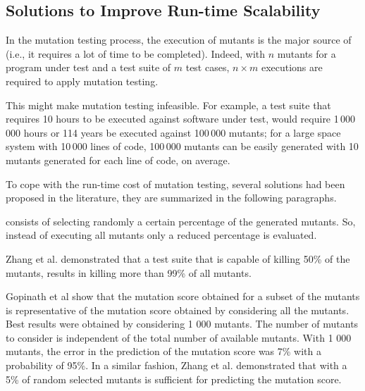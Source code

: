 
\subsection{Solutions to Improve Run-time Scalability}
\label{sec:opt:execution}

In the mutation testing process, the execution of mutants is the major source of  (i.e., it requires a lot of time to be completed). Indeed, with $n$ mutants for a program under test and a test suite of $m$ test cases, $n \times m$ executions are required to apply mutation testing.

This might make mutation testing infeasible. For example, a test suite that requires 10 hours to be executed against software under test, would require 1\,000\,000 hours or 114 years be executed against 100\,000 mutants; for a large space system with 10\,000 lines of code, 100\,000 mutants can be easily generated  with 10 mutants generated for each line of code, on average.

To cope with the run-time cost of mutation testing, several solutions had been proposed in the literature, they are summarized in the following paragraphs.

 consists of selecting randomly a certain percentage of the generated mutants. So, instead of executing all mutants only a reduced percentage is evaluated.

Zhang et al. \cite{zhang2010operator} demonstrated that a test suite that is capable of killing 50\% of the mutants, results in killing more than 99\% of all mutants.

Gopinath et al \cite{gopinath2015hard} show that the mutation score obtained for a subset of the mutants is representative of the mutation score obtained by considering all the mutants. Best results were obtained by considering 1 000 mutants. The number of mutants to consider is independent of the total number of available mutants. With 1 000 mutants, the error in the prediction of the mutation score was 7\% with a probability of 95\%. 
In a similar fashion, Zhang et al. \cite{zhang2013operator} demonstrated that with a 5\% of random selected mutants is sufficient for predicting the mutation score.

